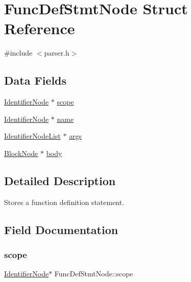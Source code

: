 \hypertarget{struct_func_def_stmt_node}{}\section{Func\+Def\+Stmt\+Node Struct Reference}
\label{struct_func_def_stmt_node}


{\ttfamily \#include $<$parser.\+h$>$}

\subsection*{Data Fields}
\begin{DoxyCompactItemize}
\item 
\hyperlink{parser_8h_a930727769b8a8eb0d24d474f3aa12a43}{Identifier\+Node} $\ast$ \hyperlink{struct_func_def_stmt_node_a545e8a727dbe8786ab90afa0a4608d68}{scope}
\item 
\hyperlink{parser_8h_a930727769b8a8eb0d24d474f3aa12a43}{Identifier\+Node} $\ast$ \hyperlink{struct_func_def_stmt_node_ab047936127219724532e25ba6890265a}{name}
\item 
\hyperlink{struct_identifier_node_list}{Identifier\+Node\+List} $\ast$ \hyperlink{struct_func_def_stmt_node_a2a9f4d580b7252e5576873d2252a187a}{args}
\item 
\hyperlink{struct_block_node}{Block\+Node} $\ast$ \hyperlink{struct_func_def_stmt_node_a9e50b6a41f7abe43b433fe4fd714b002}{body}
\end{DoxyCompactItemize}


\subsection{Detailed Description}
Stores a function definition statement. 

\subsection{Field Documentation}
\mbox{\label{struct_func_def_stmt_node_a545e8a727dbe8786ab90afa0a4608d68}} 
\subsubsection{\texorpdfstring{scope}{scope}}
{\footnotesize\ttfamily \hyperlink{parser_8h_a930727769b8a8eb0d24d474f3aa12a43}{Identifier\+Node}$\ast$ Func\+Def\+Stmt\+Node\+::scope}

